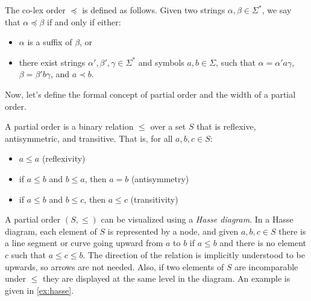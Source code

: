 \begin{definition} 
    The co-lex order $\preceq$ is defined as follows. Given two strings $\alpha, \beta \in \Sigma^*$, we say that $\alpha \preceq \beta$ if and only if either:
    \begin{itemize}[leftmargin=25pt]
        \item $\alpha$ is a suffix of $\beta$, or
        \item there exist strings $\alpha', \beta', \gamma \in \Sigma^*$ and symbols $a, b \in \Sigma$, such that $\alpha = \alpha'a\gamma$, $\beta = \beta'b\gamma$, and $a \prec b$.
    \end{itemize}
\end{definition}

Now, let's define the formal concept of partial order and the width of a partial order. 
\begin{definition}
    A partial order is a binary relation $\leq$ over a set $S$ that is reflexive, antisymmetric, and transitive. That is, for all $a, b, c \in S$:
    \begin{itemize}[leftmargin=25pt]
        \item $a \leq a$ (reflexivity)
        \item if $a \leq b$ and $b \leq a$, then $a = b$ (antisymmetry)
        \item if $a \leq b$ and $b \leq c$, then $a \leq c$ (transitivity)
    \end{itemize}
\end{definition}

A partial order $(S, \leq)$ can be visualized using a \textit{Hasse diagram}. In a Hasse diagram, each element of $S$ is represented by a node, and given $a,b,c \in S$ there is a line segment or curve going upward from $a$ to $b$ if $a \leq b$ and there is no element $c$ such that $a \leq c \leq b$. The direction of the relation is implicitly understood to be upwards, so arrows are not needed. Also, if two elements of $S$ are incomparable under $\leq$ they are displayed at the same level in the diagram. An example is given in \cref{ex:hasse}.


